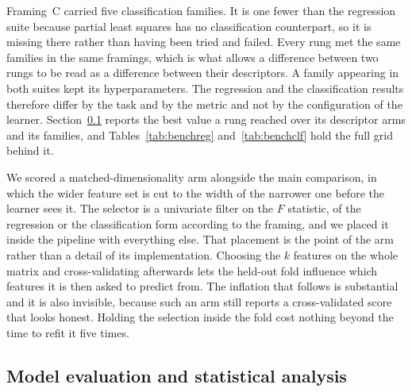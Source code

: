 \begin{table}[tb]
  \centering
  \small
  \caption{\textbf{The learning algorithms and their settings.} The scikit-learn
    estimator of each family, the framings it was scored on, every value that differs
    from the library default, and whether the features reach it standardised.}
  \label{tab:algorithms}
  
\end{table}

Framing~C carried five classification families. It is one fewer than the regression
suite because partial least squares has no classification counterpart, so it is missing
there rather than having been tried and failed. Every rung met the same families in the
same framings, which is what allows a difference between two rungs to be read as a
difference between their descriptors. A family appearing in both suites kept its
hyperparameters. The regression and the classification results therefore differ by the
task and by the metric and not by the configuration of the learner.
Section~\ref{sec:eval} reports the best value a rung reached over its descriptor arms
and its families, and Tables~\ref{tab:benchreg} and~\ref{tab:benchclf} hold the full
grid behind it.

We scored a matched-dimensionality arm alongside the main comparison, in which the
wider feature set is cut to the width of the narrower one before the learner sees it.
The selector is a univariate filter on the $F$ statistic, of the regression or the
classification form according to the framing, and we placed it inside the pipeline with
everything else. That placement is the point of the arm rather than a detail of its
implementation. Choosing the $k$ features on the whole matrix and cross-validating
afterwards lets the held-out fold influence which features it is then asked to predict
from. The inflation that follows is substantial and it is also invisible, because such
an arm still reports a cross-validated score that looks honest. Holding the selection
inside the fold cost nothing beyond the time to refit it five times.

\subsection{Model evaluation and statistical analysis}\label{sec:eval}

